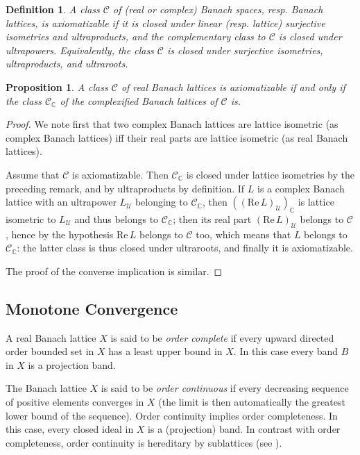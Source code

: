\documentclass[11pt]{amsart}
\theoremstyle{plain}
\newtheorem{definition}[theorem]{Definition}
\newtheorem{proposition}[theorem]{Proposition}
\theoremstyle{remark}
\newcommand{\C}{\mathcal C}
\newcommand{\U}{\mathcal U}
\renewcommand{\Re}{\mathrm {Re\,}}
\begin{document}
\begin{definition}
A class $\mathcal C$ of (real or complex) Banach spaces, resp. Banach lattices, is {\rm axiomatizable} if it is closed under linear (resp. lattice) surjective isometries and  ultraproducts, and the complementary class to $\C$ is closed under ultrapowers. Equivalently, the class $\mathcal C$ is closed under surjective isometries, ultraproducts, and ultraroots.
\end{definition} 

\begin{proposition}\label{axiom-complex-vs-real-BL}
 A class $\mathcal C$ of real Banach lattices is axiomatizable if and only if the class $\mathcal C_\mathbb C$ of the complexified Banach lattices of $\mathcal C$ is.
\end{proposition}

\begin{proof} 
We note first that two complex Banach lattices are lattice isometric (as complex Banach lattices) iff their real parts are lattice isometric (as real Banach lattices).

Assume that $\mathcal C$ is axiomatizable. Then $\mathcal C_\mathbb C$ is closed under lattice isometries by the preceding remark, and by ultraproducts by  definition. If $L$ is a complex Banach lattice with an ultrapower $L_\U$ belonging to $\mathcal C_\mathbb C$, then $((\Re L)_\U)_\mathbb C$ is lattice isometric to $L_\U$  and thus belongs to  $\mathcal C_\mathbb C$; then its real part  $(\Re L)_\U$ belongs to $\mathcal C$, hence by the hypothesis $\Re L$ belongs to $\mathcal C$ too, which means that $L$ belongs to $\mathcal C_\mathbb C$: the latter class is thus closed under ultraroots, and finally it is axiomatizable.

The proof of the converse implication is similar.
\end{proof}

\subsection{Monotone Convergence}
A real Banach lattice $X$ is said to be {\it order complete} if every upward directed order bounded set in $X$ has a least upper bound in $X$. In this case every band $B$ in $X$ is a projection band.

The Banach lattice $X$ is said to be {\it order continuous} if every decreasing sequence of positive elements converges in $X$ (the limit is then automatically the greatest lower bound of the sequence). Order continuity implies order completeness. In this case, every closed ideal in $X$ is a (projection) band. In contrast with order completeness, order continuity is hereditary by sublattices (see \cite[section 2.4]{MN}).
\end{document}
